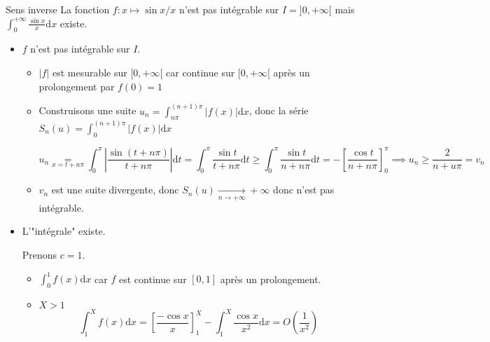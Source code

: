 \begin{Example}{Sens inverse}{}
  La fonction $f : x \mapsto \sin x / x$  n'est pas intégrable sur $I = ]0, + \infty[$ mais $\int_{0}^{+ \infty} \frac{\sin x}{x}  \mathrm{d}x$ existe.
\end{Example}

\begin{myproof}{}{}
\begin{itemize}

    \item $f$ n'est pas intégrable sur $I$. 
      \begin{itemize}

          \item $|f|$ est mesurable sur $[0, +\infty[$ car continue sur $[0, +\infty[$ après un prolongement par $f(0)=1$ 

          \item Construisons une suite $u_n = \int_{n \pi}^{(n+1) \pi} |f(x) | \mathrm{d}x$, donc la série $S_n(u) = \int_{0}^{(n+1)\pi} |f(x)| \mathrm{d}x$

          \begin{equation}
            u_n  \underset{x = t+ n \pi}{=}  \int_{0}^{\pi} | \frac{\sin (t+ n \pi)}{t + n \pi} | \mathrm{d}t = \int_{0}^{\pi} \frac{\sin t}{t+ n \pi} \mathrm{d}t \ge \int_{0}^{\pi}\frac{\sin t}{n + n \pi}  \mathrm{d}t = - \left[ \frac{\cos t}{n + n \pi}  \right]_0 ^{\pi} \implies u_n \ge \frac{2}{n + u \pi}  = v_n
          \end{equation}

        \item $v_n$ est une suite divergente, donc $S_n(u)  \underset{n \to + \infty}{\longrightarrow} +\infty$ donc n'est pas intégrable.

      \end{itemize}
      
    \item L'"intégrale" existe. 

      Prenons $c = 1$. 
      \begin{itemize}

        \item $\int_{0}^{1} f(x) \mathrm{d}x$ car $f$ est continue sur $[0,1]$ après un prolongement.
        \item $X> 1$ 
          \begin{equation}
            \int_{1}^{X} f(x) \mathrm{d}x = [ \frac{- \cos x}{x} ]_1 ^{X} - \int_{1}^{X} \frac{\cos x}{ x ^{2}}  \mathrm{d}x = O \left(\frac{1}{x ^{2}} \right)
          \end{equation}

      \end{itemize}
      

\end{itemize}
\end{myproof}
















